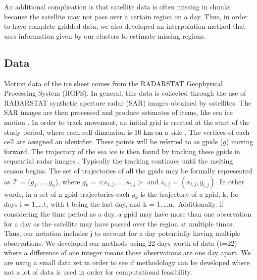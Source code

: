 \documentclass[12pt]{article}
\begin{document}
An additional complication is that satellite data is often missing in
chunks because the satellite may not pass over a certain region on a
day. Thus, in order to have complete gridded data, we also developed an
interpolation method that uses information given by our clusters to
estimate missing regions.

\hypertarget{data}{%
\subsection{Data}\label{data}}

Motion data of the ice sheet comes from the RADARSTAT Geophysical
Processing System (RGPS). In general, this data is collected through the
use of RADARSTAT synthetic aperture radar (SAR) images obtained by
satellites. The SAR images are then processed and produce estimates of
items, like sea ice motion \citep{lindsay_radarsat_2003}. In order to
track movement, an initial grid is created at the start of the study
period, where each cell dimension is 10 km on a side
\citep{kwok_seasonal_2002}. The vertices of each cell are assigned an
identifier. These points will be referred to as gpids (\(g\)) moving
forward. The trajectory of the sea ice is then found by tracking these
gpids in sequential radar images \citep{kwok_seasonal_2002}. Typically
the tracking continues until the melting season begins. The set of
trajectories of all the gpids may be formally represented as
\(\mathcal{T}\) = (\(g_1, ..., g_n\)), where \(g_{k}\) =
\textless{}\(s_{1,j},...,s_{t,j}>\) and \textbf{$s_{i,j}$} =
\((x_{i,j}, y_{i,j})\). In other words, in a set of n gpid trajectories
each \(g_k\) is the trajectory of a gpid, k, for days i = 1,\ldots,t,
with t being the last day, and k = 1,\ldots,n.~Additionally, if
considering the time period as a day, a gpid may have more than one
observation for a day as the satellite may have passed over the region
at multiple times. Thus, our notation includes j to account for a day
potentially having multiple observations. We developed our methods using
22 days worth of data (t=22) where a difference of one integer means
those observations are one day apart. We are using a small data set in
order to see if methodology can be developed where not a lot of data is
used in order for computational feasibility.
\end{document}
